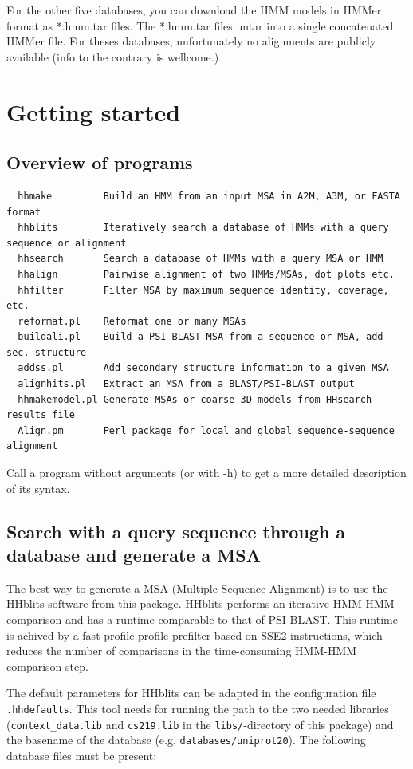 \documentclass[11pt,a4paper]{article}
\begin{document}
For the other five databases, you can download the HMM models in HMMer format as 
*.hmm.tar files. The *.hmm.tar files untar into a single concatenated HMMer file. 
For theses databases, unfortunately no alignments are publicly available (info to the 
contrary is wellcome.) 


\section{Getting started}

\subsection{Overview of programs}

\small 
\begin{verbatim}
  hhmake         Build an HMM from an input MSA in A2M, A3M, or FASTA format 
  hhblits        Iteratively search a database of HMMs with a query sequence or alignment
  hhsearch       Search a database of HMMs with a query MSA or HMM
  hhalign        Pairwise alignment of two HMMs/MSAs, dot plots etc.
  hhfilter       Filter MSA by maximum sequence identity, coverage, etc.  
  reformat.pl    Reformat one or many MSAs
  buildali.pl    Build a PSI-BLAST MSA from a sequence or MSA, add sec. structure
  addss.pl       Add secondary structure information to a given MSA
  alignhits.pl   Extract an MSA from a BLAST/PSI-BLAST output
  hhmakemodel.pl Generate MSAs or coarse 3D models from HHsearch results file	
  Align.pm       Perl package for local and global sequence-sequence alignment
\end{verbatim} 
\normalsize

Call a program without arguments (or with -h) to get a more detailed description of 
its syntax.


\subsection{Search with a query sequence through a database and generate a MSA}

The best way to generate a MSA (Multiple Sequence Alignment) is to use the HHblits software 
from this package. HHblits performs an iterative HMM-HMM comparison and has a runtime comparable 
to that of PSI-BLAST. This runtime is achived by a fast profile-profile prefilter based on SSE2 
instructions, which reduces the number of comparisons in the time-consuming HMM-HMM comparison 
step.

The default parameters for HHblits can be adapted in the configuration file 
\verb`.hhdefaults`. This tool needs for running the path to the two needed libraries
(\verb`context_data.lib` and \verb`cs219.lib` in the \verb`libs/`-directory of this package) 
and the basename of the database (e.g. \verb`databases/uniprot20`). The following database files 
must be present:
\end{document}
